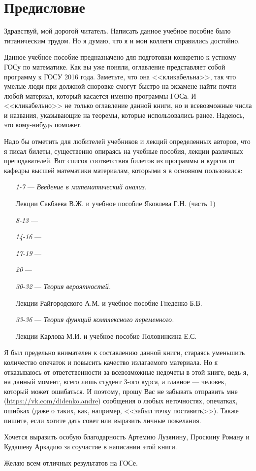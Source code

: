 \chapter{Предисловие}
Здравствуй, мой дорогой читатель. Написать данное учебное пособие было титаническим трудом. Но я думаю, что я и мои коллеги справились достойно.

Данное учебное пособие предназначено для подготовки конкретно к устному ГОСу по математике. Как вы уже поняли, оглавление представляет собой программу к ГОСУ 2016 года. Заметьте, что она <<кликабельна>>, так что умелые люди при должной сноровке смогут быстро на экзамене найти почти любой материал, который касается именно программы ГОСа. И <<кликабельно>> не только оглавление данной книги, но и всевозможные числа и названия, указывающие на теоремы, которые использовались ранее. Надеюсь, это кому-нибудь поможет. 

Надо бы отметить для любителей учебников и лекций определенных авторов, что я писал билеты, существенно опираясь на учебные пособия, лекции различных преподавателей. Вот список соответствия билетов из программы и курсов от кафедры высшей математики материалам, которыми я в основном пользовался:
\begin{itemize}
\item[\textit{1-7}]
\; --- \: \textit{Введение в математический анализ.} 

Лекции Сакбаева В.Ж. и учебное пособие Яковлева Г.Н. (часть 1)
\item[\textit{8-13}]
\; --- \:
\item[\textit{14-16}]
\; --- \:
\item[\textit{17-19}]
\; --- \:
\item[\textit{20}]
\; --- \:
\item[\textit{30-32}]
\; --- \:  \textit{Теория вероятностей.}

Лекции Райгородского А.М. и учебное пособие Гнеденко Б.В.
\item[\textit{33-36}]
\; --- \: \textit{Теория функций комплексного переменного.}

Лекции Карлова М.И. и учебное пособие Половинкина Е.С.
\end{itemize}

Я был предельно внимателен к составлению данной книги, стараясь уменьшить количество опечаток и повысить качество излагаемого материала. Но я отказываюсь от ответственности за всевозможные недочеты в этой книге, ведь я, на данный момент, всего лишь студент 3-ого курса, а главное --- человек, который может ошибаться. И поэтому, прошу Вас не забывать отправить мне (\url{https://vk.com/didenko.andre}) сообщения о любых неточностях, опечатках, ошибках (даже о таких, как, например, <<забыл точку поставить>>). Также пишите, если хотите дать совет или выразить личные пожелания. 

Хочется выразить особую благодарность Артемию Лузянину, Проскину Роману и Кудашеву Аркадию за соучастие в написании этой книги.
 
\vspace*{\baselineskip}
Желаю всем отличных результатов на ГОСе.